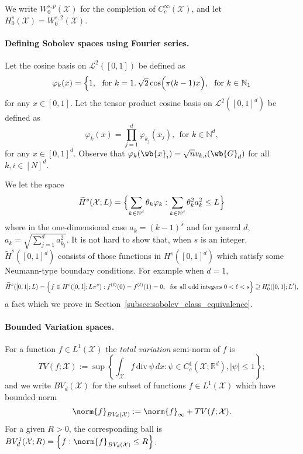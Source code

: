 \documentclass{article}
\newcommand{\Reals}{\mathbb{R}}
\newcommand{\abs}[1]{\left \lvert #1 \right \rvert}
\newcommand{\set}[1]{\left\{#1\right\}}
\newcommand{\1}{\mathbf{1}}
\newcommand{\Nbb}{\mathbb{N}}
\newcommand{\Xset}{\mathcal{X}}
\newcommand{\Leb}{\mathcal{L}}
\newcommand{\Xsetive}{\mathrm{div}}
\newcommand{\wt}[1]{\widetilde{#1}}
\theoremstyle{alden}
\theoremstyle{aldenthm}
\theoremstyle{definition}
\theoremstyle{remark}
\begin{document}
We write $W_0^{s,p}(\Xset)$ for the completion of $C_c^{\infty}(\Xset)$, and let $H_0^s(\Xset) = W_0^{s,2}(\Xset)$.  

\paragraph{Defining Sobolev spaces using Fourier series.}

Let the cosine basis on $\Leb^2([0,1])$ be defined as 
\begin{equation*}
\varphi_k(x) = 
\begin{cases*}
1,~~\textrm{for $k = 1$.} \,
\sqrt{2}\cos\Bigl(\pi (k - 1) x\Bigr),~~\textrm{for $k \in \Nbb_1$}
\end{cases*}
\end{equation*}
for any $x \in [0,1]$. Let the tensor product cosine basis on $\Leb^2([0,1]^d)$ be defined as
\begin{equation*}
\varphi_k(x) = \prod_{j = 1}^{d} \varphi_{k_j}(x_j), ~~\textrm{for $k \in \Nbb^d$},
\end{equation*}
for any $x \in [0,1]^d$. Observe that $\varphi_k(\wb{x}_i) = \sqrt{n} v_{k,i}(\wb{G}_d)$ for all $k,i \in [N]^d$.

We let the space 
\begin{equation*}
\wt{H}^{s}(\Xset;L) = \Bigl\{ \sum_{k \in \mathbb{N}^d} \theta_k \varphi_k: \sum_{k \in \mathbb{N}^d} \theta_k^2 a_k^{2} \leq L \Bigr\}
\end{equation*}
where in the one-dimensional case $a_{k} = (k - 1)^s$ and for general $d$, $a_k = \sqrt{\sum_{j = 1}^{d} a_{k_j}^2}$. It is not hard to show that, when $s$ is an integer, $\wt{H}^s([0,1]^d)$ consists of those functions in $H^s([0,1]^d)$ which satisfy some Neumann-type boundary conditions. For example when $d = 1$,
\begin{equation*}
\wt{H}^s([0,1];L) = \Bigl\{f \in H^{s}([0,1];L \pi^{s}): f^{(\ell)}(0) = f^{(\ell)}(1) = 0,~~\textrm{for all odd integers $0 < \ell < s$} \Bigr \} \supseteq H_0^s([0,1];L'),
\end{equation*}
a fact which we prove in Section~\ref{subsec:sobolev_class_equivalence}.

\paragraph{Bounded Variation spaces.}

For a function $f \in L^1(\mathcal{X})$ the \emph{total variation} semi-norm of $f$ is
\begin{equation*}
TV(f;\mathcal{X}) := \sup \left\{ \int_{\mathcal{X}} f \, \Xsetive \, \psi \,dx : \psi \in C_c^1(\mathcal{X}; \Reals^d), \abs{\psi} \leq 1 \right\};
\end{equation*}
and we write $BV_d(\mathcal{X})$ for the subset of functions $f \in L^1(\mathcal{X})$ which have bounded norm
\begin{equation*}
\norm{f}_{BV_d(\mathcal{X})} := \norm{f}_{\infty} + TV(f;\mathcal{X}).
\end{equation*}
For a given $R > 0$, the corresponding ball is $BV_d^{1}(\mathcal{X};R) = \set{f: \norm{f}_{BV_d(\mathcal{X})} \leq R}$. 
\end{document}
